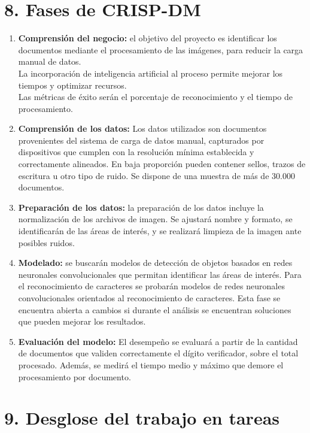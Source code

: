 \documentclass[
11pt, %
]{charter}
\begin{document}
\section{8. Fases de CRISP-DM}

\begin{enumerate}
  \item \textbf{Comprensión del negocio:} el objetivo del proyecto es identificar los documentos mediante el procesamiento de las imágenes, para reducir la carga manual de datos. \\
  La incorporación de inteligencia artificial al proceso permite mejorar los tiempos y optimizar recursos. \\
  Las métricas de éxito serán el porcentaje de reconocimiento y el tiempo de procesamiento.
  \item \textbf{Comprensión de los datos:} Los datos utilizados son documentos provenientes del sistema de carga de datos manual, capturados por dispositivos que cumplen con la resolución mínima establecida y correctamente alineados. En baja proporción pueden contener sellos, trazos de escritura u otro tipo de ruido. Se dispone de una muestra de más de 30.000 documentos.
  \item \textbf{Preparación de los datos:} la preparación de los datos incluye la normalización de los archivos de imagen. Se ajustará nombre y formato, se identificarán de las áreas de interés, y se realizará limpieza de la imagen ante posibles ruidos.
  \item \textbf{Modelado:} se buscarán modelos de detección de objetos basados en redes neuronales convolucionales que permitan identificar las áreas de interés. Para el reconocimiento de caracteres se probarán modelos de redes neuronales convolucionales orientados al reconocimiento de caracteres. Esta fase se encuentra abierta a cambios si durante el análisis se encuentran soluciones que pueden mejorar los resultados.
  \item \textbf{Evaluación del modelo:} El desempeño se evaluará a partir de la cantidad de documentos que validen correctamente el dígito verificador, sobre el total procesado. Además, se medirá el tiempo medio y máximo que demore el procesamiento por documento.
\end{enumerate}

\newpage
\section{9. Desglose del trabajo en tareas}
\label{sec:wbs}
\end{document}
